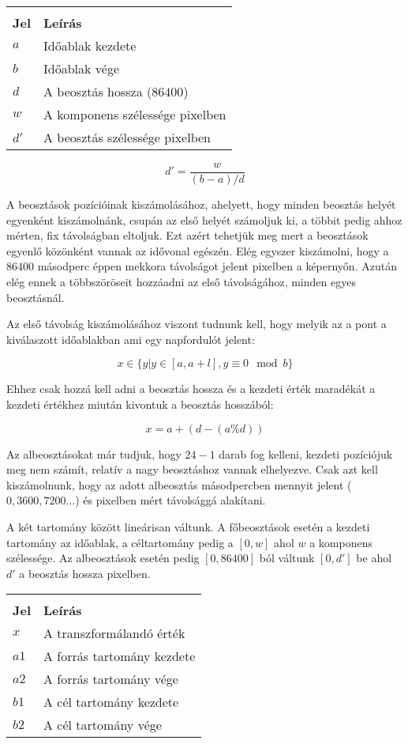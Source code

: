 \begin{tabular}{@{}ll@{}}
	& \\
	\textbf{Jel} & \textbf{Leírás} \\
	$a$ & Időablak kezdete \\
	$b$ & Időablak vége \\
	$d$ & A beosztás hossza ($86400$) \\
	$w$ & A komponens szélessége pixelben \\
	$d'$ & A beosztás szélessége pixelben \\
\end{tabular}
$$d' = \frac{w}{(b - a) / d}$$

A beosztások pozícióinak kiszámolásához, ahelyett, hogy minden beosztás helyét egyenként kiszámolnánk, csupán az első helyét számoljuk ki, a többit pedig ahhoz mérten, fix távolságban eltoljuk. Ezt azért tehetjük meg mert a beosztások egyenlő közönként vannak az idővonal egészén. Elég egyszer kiszámolni, hogy a $86400$ másodperc éppen mekkora távolságot jelent pixelben a képernyőn. Azután elég ennek a többszöröseit hozzáadni az első távolságához, minden egyes beosztásnál.

Az első távolság kiszámolásához viszont tudnunk kell, hogy melyik az a pont a kiválaszott időablakban ami egy napfordulót jelent:

$$x \in \{ y | y \in [a, a+l], y \equiv 0 \mod b\}$$

Ehhez csak hozzá kell adni a beosztás hossza és a kezdeti érték maradékát a kezdeti értékhez miután kivontuk a beosztás hosszából:

$$x = a + (d - (a \% d))$$

Az albeosztásokat már tudjuk, hogy $24 - 1$ darab fog kelleni, kezdeti pozíciójuk meg nem számít, relatív a nagy beosztáshoz vannak elhelyezve. Csak azt kell kiszámolnunk, hogy az adott albeosztás másodpercben mennyit jelent ($0, 3600, 7200 \dots $) és pixelben mért távolsággá alakítani.


A két tartomány között lineárisan váltunk. A főbeosztások esetén a kezdeti tartomány az időablak, a céltartomány pedig a $[0, w]$ ahol $w$ a komponens szélessége. Az albeosztások esetén pedig $[0, 86400]$ ból váltunk $[0, d']$ be ahol $d'$ a beosztás hossza pixelben.

\begin{tabular}{@{}ll@{}}
	& \\
	\textbf{Jel} & \textbf{Leírás} \\
	$x$ & A transzformálandó érték \\
	$a1$ & A forrás tartomány kezdete \\
	$a2$ & A forrás tartomány vége \\
	$b1$ & A cél tartomány kezdete \\
	$b2$ & A cél tartomány vége \\
\end{tabular}

